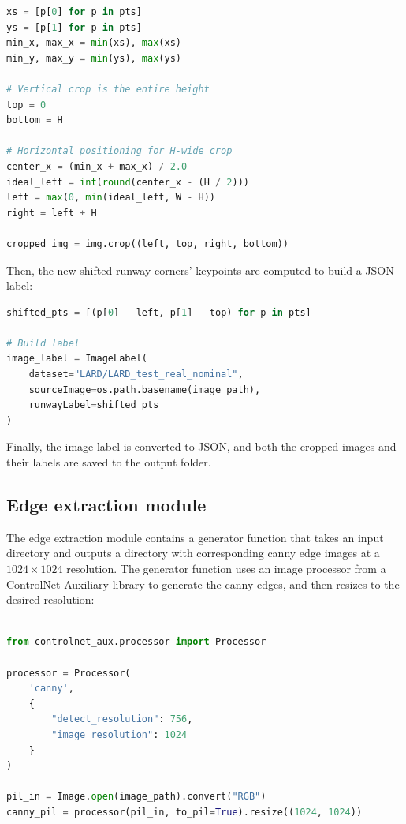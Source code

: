 \begin{lstlisting}[language=Python, caption={Template image selection module,
image pre-processing}]
xs = [p[0] for p in pts]
ys = [p[1] for p in pts]
min_x, max_x = min(xs), max(xs)
min_y, max_y = min(ys), max(ys)

# Vertical crop is the entire height
top = 0
bottom = H

# Horizontal positioning for H-wide crop
center_x = (min_x + max_x) / 2.0
ideal_left = int(round(center_x - (H / 2)))
left = max(0, min(ideal_left, W - H))
right = left + H

cropped_img = img.crop((left, top, right, bottom))
\end{lstlisting}

Then, the new shifted runway corners' keypoints are computed to build a JSON label:

\begin{lstlisting}[language=Python, caption={Template image selection module,
label building}]
shifted_pts = [(p[0] - left, p[1] - top) for p in pts]

# Build label
image_label = ImageLabel(
    dataset="LARD/LARD_test_real_nominal",
    sourceImage=os.path.basename(image_path),
    runwayLabel=shifted_pts
)
\end{lstlisting}

Finally, the image label is converted to JSON, and both the cropped images and their labels are saved to the output folder.

\subsection{Edge extraction module}

The edge extraction module contains a generator function that takes an input directory and outputs a directory with corresponding canny edge images at a $1024 \times 1024$ resolution. 
The generator function uses an image processor from a ControlNet Auxiliary library to generate the canny edges, and then resizes to the desired resolution:

\begin{lstlisting}[language=Python, caption={Edge extraction module,
edge extraction}]

from controlnet_aux.processor import Processor

processor = Processor(
    'canny',
    {
        "detect_resolution": 756,
        "image_resolution": 1024
    }
)

pil_in = Image.open(image_path).convert("RGB")
canny_pil = processor(pil_in, to_pil=True).resize((1024, 1024))
\end{lstlisting}

